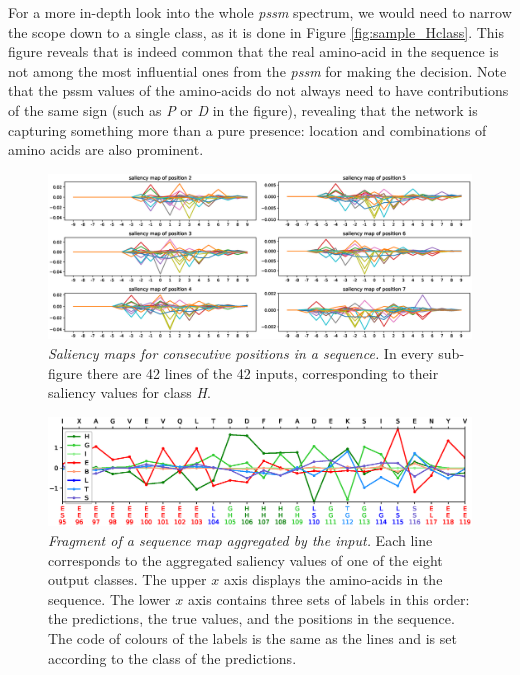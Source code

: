 For a more in-depth look into the whole \textit{pssm} spectrum, we would need to narrow the scope down to a single class, as it is done in Figure \ref{fig:sample_Hclass}. This figure reveals that is indeed common that the real amino-acid in the sequence is not among the most influential ones from the \textit{pssm} for making the decision. Note that the pssm values of the amino-acids do not always need to have contributions of the same sign (such as \textit{P} or \textit{D} in the figure), revealing that the network is capturing something more than a pure presence: location and combinations of amino acids are also prominent.

\begin{figure}
	\centering
	\includegraphics[width=1\linewidth]{Figures/sliding}
	\caption{\textit{Saliency maps for consecutive positions in a sequence.} In every sub-figure there are 42 lines of the 42 inputs, corresponding to their saliency values for class \textit{H}.}
	\label{fig:sliding}
\end{figure}


\begin{figure}
	\centering
	\includegraphics[width=1\linewidth]{Figures/sample_8classes}
	\caption{\textit{Fragment of a sequence map aggregated by the input.} Each line corresponds to the aggregated saliency values of one of the eight output classes. The upper $x$ axis displays the amino-acids in the sequence. The lower $x$ axis contains three sets of labels in this order: the predictions, the true values, and the positions in the sequence. The code of colours of the labels is the same as the lines and is set according to the class of the predictions.}
	\label{fig:sample_8classes}
\end{figure}


